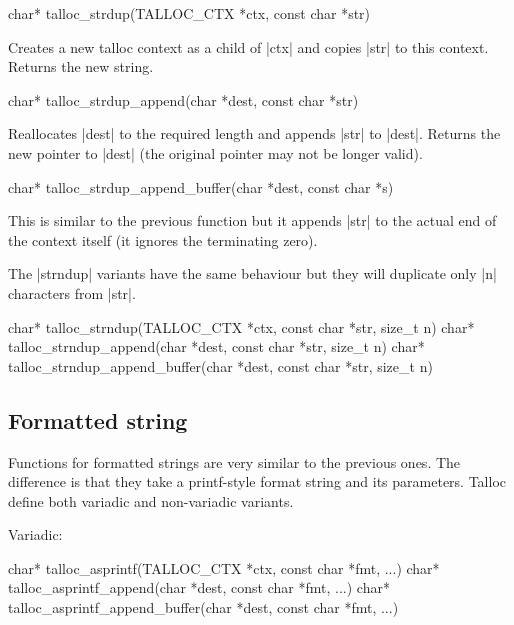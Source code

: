 \begin{funcproto}
char* talloc_strdup(TALLOC_CTX *ctx, const char *str)
\end{funcproto}
\begin{funcdesc}
  Creates a new talloc context as a child of |ctx| and copies |str| to
  this context. Returns the new string.
\end{funcdesc}
\begin{funcproto}
char* talloc_strdup_append(char *dest, const char *str)
\end{funcproto}
\begin{funcdesc}
  Reallocates |dest| to the required length and appends |str| to |dest|. Returns
  the new pointer to |dest| (the original pointer may not be longer valid).
\end{funcdesc}
\begin{funcproto}
char* talloc_strdup_append_buffer(char *dest, const char *s)
\end{funcproto}
\begin{funcdesc}
  This is similar to the previous function but it appends |str| to the actual
  end of the context itself (it ignores the terminating zero).
\end{funcdesc}
\funclistend
The |strndup| variants have the same behaviour but they will duplicate only |n|
characters from |str|.

\begin{funcproto}
char* talloc_strndup(TALLOC_CTX *ctx, const char *str,
                     size_t n)
char* talloc_strndup_append(char *dest, const char *str,
                            size_t n)
char* talloc_strndup_append_buffer(char *dest, const char
                                   *str, size_t n)
\end{funcproto}

\subsection{Formatted string}

Functions for formatted strings are very similar to the previous ones. The
difference is that they take a printf-style format string and its parameters.
Talloc define both variadic and non-variadic variants.

Variadic:
\begin{funcproto}
char* talloc_asprintf(TALLOC_CTX *ctx, const char *fmt, ...)
char* talloc_asprintf_append(char *dest, const char *fmt,
                             ...)
char* talloc_asprintf_append_buffer(char *dest, const char
                                    *fmt, ...)
\end{funcproto}

